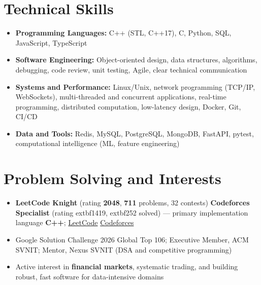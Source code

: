 \documentclass[a4paper,10pt]{article}
\begin{document}
\section{Technical Skills}
\small
\begin{itemize}[label={}]
  \item \textbf{Programming Languages:} C++ (STL, C++17), C, Python, SQL, JavaScript, TypeScript
  \item \textbf{Software Engineering:} Object-oriented design, data structures, algorithms, debugging, code review, unit testing, Agile, clear technical communication
  \item \textbf{Systems and Performance:} Linux/Unix, network programming (TCP/IP, WebSockets), multi-threaded and concurrent applications, real-time programming, distributed computation, low-latency design, Docker, Git, CI/CD
  \item \textbf{Data and Tools:} Redis, MySQL, PostgreSQL, MongoDB, FastAPI, pytest, computational intelligence (ML, feature engineering)
\end{itemize}

\section{Problem Solving and Interests}
\small
\begin{itemize}
  \item \textbf{LeetCode Knight} (rating \textbf{2048}, \textbf{711} problems, 32 contests) \textbar{} \textbf{Codeforces Specialist} (rating 	extbf{1419}, 	extbf{252} solved) --- primary implementation language \textbf{C++}; \href{https://leetcode.com/Oju_Srivastava}{LeetCode} \textbar{} \href{https://codeforces.com/profile/Oju}{Codeforces}
  \item Google Solution Challenge 2026 Global Top 106; Executive Member, ACM SVNIT; Mentor, Nexus SVNIT (DSA and competitive programming)
  \item Active interest in \textbf{financial markets}, systematic trading, and building robust, fast software for data-intensive domains
\end{itemize}
\end{document}
